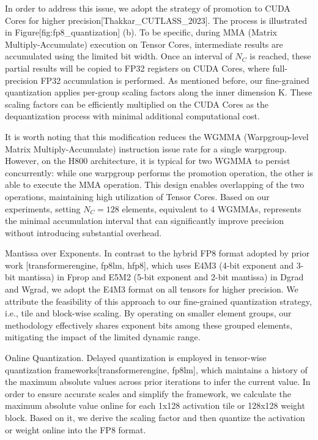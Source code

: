 \documentclass[11pt,a4paper]{article}
\begin{document}
In order to address this issue, we adopt the strategy of promotion to CUDA Cores for higher precision[Thakkar\_CUTLASS\_2023]. The process is illustrated in Figure[fig:fp8\_quantization] (b). To be specific, during MMA (Matrix Multiply-Accumulate) execution on Tensor Cores, intermediate results are accumulated using the limited bit width. Once an interval of  $N_C$  is reached, these partial results will be copied to FP32 registers on CUDA Cores, where full-precision FP32 accumulation is performed. As mentioned before, our fine-grained quantization applies per-group scaling factors along the inner dimension K. These scaling factors can be efficiently multiplied on the CUDA Cores as the dequantization process with minimal additional computational cost.

It is worth noting that this modification reduces the WGMMA (Warpgroup-level Matrix Multiply-Accumulate) instruction issue rate for a single warpgroup. However, on the H800 architecture, it is typical for two WGMMA to persist concurrently: while one warpgroup performs the promotion operation, the other is able to execute the MMA operation. This design enables overlapping of the two operations, maintaining high utilization of Tensor Cores. Based on our experiments, setting  $N_C=128$  elements, equivalent to 4 WGMMAs, represents the minimal accumulation interval that can significantly improve precision without introducing substantial overhead.

Mantissa over Exponents. In contrast to the hybrid FP8 format adopted by prior work [transformerengine, fp8lm, hfp8], which uses E4M3 (4-bit exponent and 3-bit mantissa) in Fprop and E5M2 (5-bit exponent and 2-bit mantissa) in Dgrad and Wgrad, we adopt the E4M3 format on all tensors for higher precision. We attribute the feasibility of this approach to our fine-grained quantization strategy, i.e., tile and block-wise scaling. By operating on smaller element groups, our methodology effectively shares exponent bits among these grouped elements, mitigating the impact of the limited dynamic range.

Online Quantization. Delayed quantization is employed in tensor-wise quantization frameworks[transformerengine, fp8lm], which maintains a history of the maximum absolute values across prior iterations to infer the current value. In order to ensure accurate scales and simplify the framework, we calculate the maximum absolute value online for each 1x128 activation tile or 128x128 weight block. Based on it, we derive the scaling factor and then quantize the activation or weight online into the FP8 format.
\end{document}

